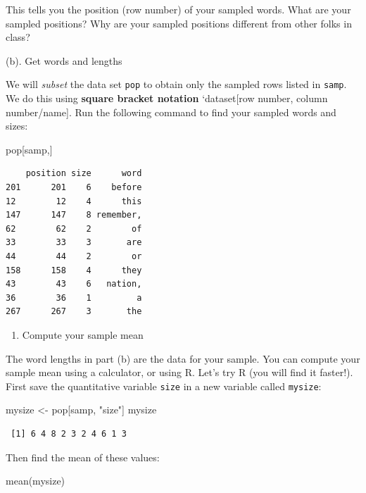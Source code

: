 \documentclass[
]{book}
\newenvironment{Shaded}{\begin{snugshade}}{\end{snugshade}}
\newcommand{\FunctionTok}[1]{\textcolor[rgb]{0.00,0.00,0.00}{#1}}
\newcommand{\NormalTok}[1]{#1}
\newcommand{\OtherTok}[1]{\textcolor[rgb]{0.56,0.35,0.01}{#1}}
\newcommand{\StringTok}[1]{\textcolor[rgb]{0.31,0.60,0.02}{#1}}
\providecommand{\tightlist}{%
  \setlength{\itemsep}{0pt}\setlength{\parskip}{0pt}}
\begin{document}
This tells you the position (row number) of your sampled words. What are your sampled positions? Why are your sampled positions different from other folks in class?

(b). Get words and lengths

We will \emph{subset} the data set \texttt{pop} to obtain only the sampled rows listed in \texttt{samp}. We do this using \textbf{square bracket notation} `dataset{[}row number, column number/name{]}. Run the following command to find your sampled words and sizes:

\begin{Shaded}
\begin{Highlighting}[]
\NormalTok{pop[samp,]}
\end{Highlighting}
\end{Shaded}

\begin{verbatim}
    position size      word
201      201    6    before
12        12    4      this
147      147    8 remember,
62        62    2        of
33        33    3       are
44        44    2        or
158      158    4      they
43        43    6   nation,
36        36    1         a
267      267    3       the
\end{verbatim}

\begin{enumerate}
\def\labelenumi{\alph{enumi}.}
\setcounter{enumi}{2}
\tightlist
\item
  Compute your sample mean
\end{enumerate}

The word lengths in part (b) are the data for your sample. You can compute your sample mean using a calculator, or using R. Let's try R (you will find it faster!). First save the quantitative variable \texttt{size} in a new variable called \texttt{mysize}:

\begin{Shaded}
\begin{Highlighting}[]
\NormalTok{mysize }\OtherTok{\textless{}{-}}\NormalTok{ pop[samp, }\StringTok{"size"}\NormalTok{]}
\NormalTok{mysize}
\end{Highlighting}
\end{Shaded}

\begin{verbatim}
 [1] 6 4 8 2 3 2 4 6 1 3
\end{verbatim}

Then find the mean of these values:

\begin{Shaded}
\begin{Highlighting}[]
\FunctionTok{mean}\NormalTok{(mysize)}
\end{Highlighting}
\end{Shaded}
\end{document}

